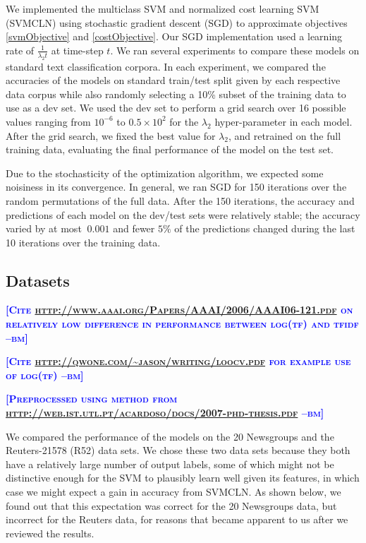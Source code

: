 \documentclass{article} %
\newcommand{\bmcomment}[1]{\textcolor{blue}{\textsc{\textbf{[#1 --bm]}}}}
\begin{document}
We implemented the multiclass SVM and normalized cost learning SVM (SVMCLN) 
using stochastic gradient descent (SGD) to approximate objectives
\ref{svmObjective} and \ref{costObjective}.  Our SGD implementation
used a learning rate of $\frac{1}{\lambda_2 t}$ at time-step $t$.
We ran several experiments to compare these models on standard
text classification corpora.  In each experiment, we compared 
the accuracies of the models on standard train/test split 
given by each respective
data corpus while also randomly selecting a 10\% subset of the 
training data to use as a dev set.  We used the dev set to perform
a grid search over 16 possible values ranging from $10^{-6}$ to 
$0.5\times 10^2$ for the $\lambda_2$ hyper-parameter in each model.
After the grid search, we fixed the best value for $\lambda_2$,
and retrained on the full training data,
evaluating the final performance of the model on the test set.  
 
Due to the stochasticity of the optimization algorithm, we 
expected some noisiness in its convergence.  In general, we 
ran SGD for 150 iterations over the random permutations
of the full data. After the 150 iterations, the accuracy and 
predictions of each model on the dev/test sets were relatively 
stable; the accuracy varied by at most $~0.001$ and 
fewer $5\%$ of the predictions changed 
during the last 10 iterations over the training 
data. 

\subsection{Datasets}

\bmcomment{Cite \url{http://www.aaai.org/Papers/AAAI/2006/AAAI06-121.pdf}
on relatively low difference in performance between log(tf) and tfidf}

\bmcomment{Cite \url{http://qwone.com/~jason/writing/loocv.pdf} for 
example use of log(tf)}

\bmcomment{Preprocessed using method from 
\url{http://web.ist.utl.pt/acardoso/docs/2007-phd-thesis.pdf}}

We compared the performance of the models on the 20 Newsgroups and
the Reuters-21578 (R52) data sets.  We chose these two data sets
because they both have a relatively large number of output labels,
some of which might not be distinctive enough for the SVM to plausibly
learn well given its features, in which case we might expect a gain in 
accuracy from SVMCLN.  As shown below, we found out that this 
expectation was correct for the 20 Newsgroups data, but incorrect for 
the Reuters data, for reasons that became apparent to us after we
reviewed the results.
\end{document}
